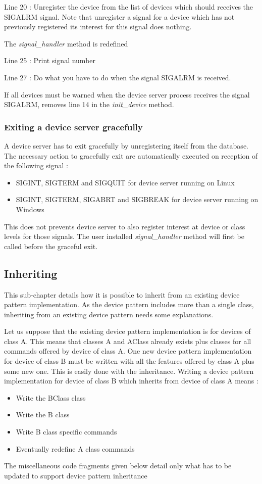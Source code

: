 Line 20 : Unregister the device from the list of devices which should
receives the SIGALRM signal. Note that unregister a signal for a device
which has not previously registered its interest for this signal does
nothing.

The \emph{signal\_handler} method is redefined

Line 25 : Print signal number

Line 27 : Do what you have to do when the signal SIGALRM is received.

If all devices must be warned when the device server process receives
the signal SIGALRM, removes line 14 in the \emph{init\_device} method.

\subsubsection{Exiting a device server gracefully}

A device server has to exit gracefully
by unregistering itself from the database. The necessary action to
gracefully exit are automatically executed on reception of the following
signal :
\begin{itemize}
\item SIGINT, SIGTERM and SIGQUIT for device server running on Linux
\item SIGINT, SIGTERM, SIGABRT and SIGBREAK for device server running on
Windows
\end{itemize}
This does not prevents device server to also register interest at
device or class levels for those signals. The user installed \emph{signal\_handler}
method will first be called before the graceful exit.

\subsection{Inheriting\label{Inheriting}}

This sub-chapter details how it is possible to inherit
from an existing device pattern implementation. As the device pattern
includes more than a single class, inheriting from an existing device
pattern needs some explanations.

Let us suppose that the existing device pattern implementation is
for devices of class A. This means that classes A and AClass already
exists plus classes for all commands offered by device of class A.
One new device pattern implementation for device of
class B must be written with all the features offered by class A plus
some new one. This is easily done with the inheritance. Writing a
device pattern implementation for device of class B which inherits
from device of class A means :
\begin{itemize}
\item Write the BClass class
\item Write the B class
\item Write B class specific commands
\item Eventually redefine A class commands
\end{itemize}
The miscellaneous code fragments given below detail only what has
to be updated to support device pattern inheritance


